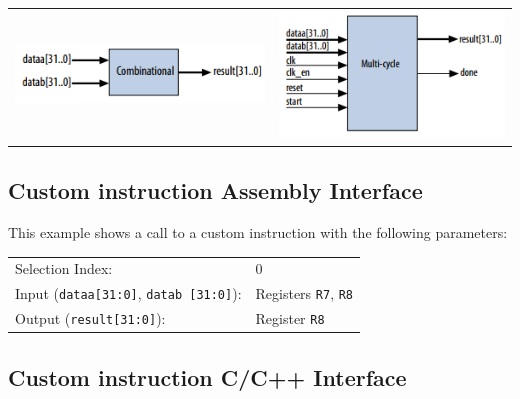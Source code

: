 		\begin{tabular}{p{}p{}}
			\vspace{0pt}
			
			\includegraphics[width=0.8\linewidth]{./pictures/customInstCombinational.png}
			& \vspace{0pt}
			
			\includegraphics[width=0.8\linewidth]{./pictures/customInstMultiCycle.png}\\
		\end{tabular}
		
	\subsection{Custom instruction Assembly Interface}
		This example shows a call to a custom instruction with the following parameters:
	
		\begin{table}[H]\centering
			\begin{tabular}{ll}
				Selection Index: 
					& 0\\
				Input (\texttt{dataa[31:0]}, \texttt{datab [31:0]}): 
					& Registers \texttt{R7}, \texttt{R8}\\
				Output (\texttt{result[31:0]}): 
					& Register \texttt{R8}\\
			\end{tabular}
		\end{table}
		
		

	\subsection{Custom instruction C/C++ Interface}
		